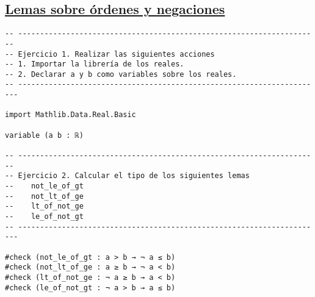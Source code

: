 \subsection{\href{./src/Logica/Lemas\_sobre\_ordenes\_y\_negaciones.lean}{Lemas sobre órdenes y negaciones}}
\label{sec:orgbc81543}
\begin{verbatim}
-- ---------------------------------------------------------------------
-- Ejercicio 1. Realizar las siguientes acciones
-- 1. Importar la librería de los reales.
-- 2. Declarar a y b como variables sobre los reales.
-- ----------------------------------------------------------------------

import Mathlib.Data.Real.Basic

variable (a b : ℝ)

-- ---------------------------------------------------------------------
-- Ejercicio 2. Calcular el tipo de los siguientes lemas
--    not_le_of_gt
--    not_lt_of_ge
--    lt_of_not_ge
--    le_of_not_gt
-- ----------------------------------------------------------------------

#check (not_le_of_gt : a > b → ¬ a ≤ b)
#check (not_lt_of_ge : a ≥ b → ¬ a < b)
#check (lt_of_not_ge : ¬ a ≥ b → a < b)
#check (le_of_not_gt : ¬ a > b → a ≤ b)
\end{verbatim}

